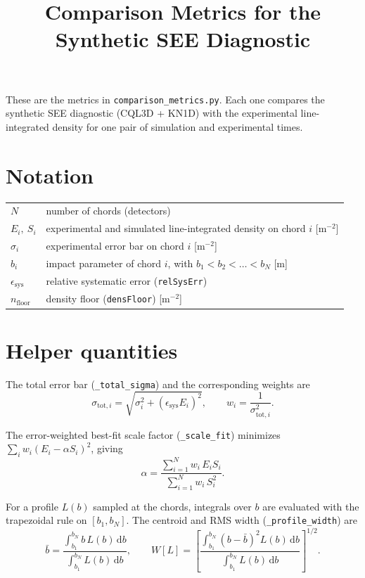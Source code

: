 \documentclass[11pt]{article}
\title{Comparison Metrics for the Synthetic SEE Diagnostic}
\date{}
\begin{document}
\maketitle

These are the metrics in \texttt{comparison\_metrics.py}. Each one compares the synthetic SEE
diagnostic (CQL3D + KN1D) with the experimental line-integrated density for one pair of
simulation and experimental times.

\section*{Notation}

\begin{tabular}{ll}
  $N$                       & number of chords (detectors) \\
  $E_i,\ S_i$               & experimental and simulated line-integrated density on chord $i$ [m$^{-2}$] \\
  $\sigma_i$                & experimental error bar on chord $i$ [m$^{-2}$] \\
  $b_i$                     & impact parameter of chord $i$, with $b_1 < b_2 < \dots < b_N$ [m] \\
  $\epsilon_{\mathrm{sys}}$ & relative systematic error (\texttt{relSysErr}) \\
  $n_{\mathrm{floor}}$      & density floor (\texttt{densFloor}) [m$^{-2}$]
\end{tabular}

\section*{Helper quantities}

The total error bar (\texttt{\_total\_sigma}) and the corresponding weights are
\begin{equation}
  \sigma_{\mathrm{tot},i} = \sqrt{\sigma_i^2 + \left(\epsilon_{\mathrm{sys}} E_i\right)^2},
  \qquad
  w_i = \frac{1}{\sigma_{\mathrm{tot},i}^2}.
\end{equation}

The error-weighted best-fit scale factor (\texttt{\_scale\_fit}) minimizes
$\sum_i w_i (E_i - \alpha S_i)^2$, giving
\begin{equation}
  \alpha = \frac{\sum_{i=1}^{N} w_i\, E_i S_i}{\sum_{i=1}^{N} w_i\, S_i^2}.
\end{equation}

For a profile $L(b)$ sampled at the chords, integrals over $b$ are evaluated with the
trapezoidal rule on $[b_1, b_N]$. The centroid and RMS width (\texttt{\_profile\_width}) are
\begin{equation}
  \bar{b} = \frac{\int_{b_1}^{b_N} b\, L(b)\,\mathrm{d}b}{\int_{b_1}^{b_N} L(b)\,\mathrm{d}b},
  \qquad
  W[L] = \left[\frac{\int_{b_1}^{b_N} \left(b - \bar{b}\right)^2 L(b)\,\mathrm{d}b}
                    {\int_{b_1}^{b_N} L(b)\,\mathrm{d}b}\right]^{1/2}.
\end{equation}
\end{document}
